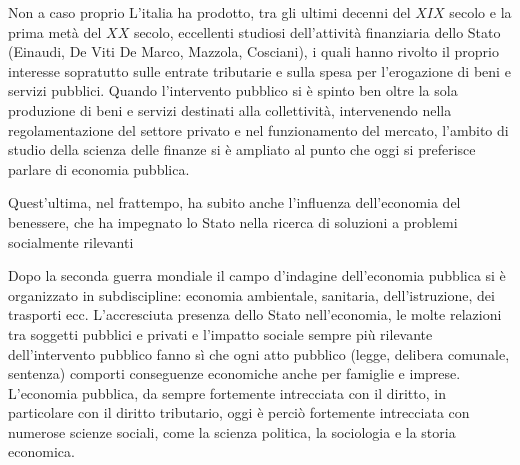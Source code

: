 \documentclass{report}
\begin{document}
Non a caso proprio L'italia ha prodotto, tra gli ultimi decenni del $XIX$ secolo e la prima metà del $XX$ secolo, eccellenti studiosi dell'attività finanziaria dello Stato (Einaudi, De Viti De Marco, Mazzola, Cosciani), i quali hanno rivolto il proprio interesse sopratutto sulle entrate tributarie e sulla spesa per l'erogazione di beni e servizi pubblici.
Quando l'intervento pubblico si è spinto ben oltre la sola produzione di beni e servizi destinati alla collettività, intervenendo nella regolamentazione del settore privato e nel funzionamento del mercato, l'ambito di studio della scienza delle finanze si è ampliato al punto che oggi si preferisce parlare di economia pubblica.

Quest'ultima, nel frattempo, ha subito anche l'influenza dell'economia del benessere, che ha impegnato lo Stato nella ricerca di soluzioni a problemi socialmente rilevanti

Dopo la seconda guerra mondiale il campo d'indagine dell'economia pubblica si è organizzato in subdiscipline: economia ambientale, sanitaria, dell'istruzione, dei trasporti ecc.
L'accresciuta presenza dello Stato nell'economia, le molte relazioni tra soggetti pubblici e privati e l'impatto sociale sempre più rilevante dell'intervento pubblico fanno sì che ogni atto pubblico (legge, delibera comunale, sentenza) comporti conseguenze economiche anche per famiglie e imprese.
L'economia pubblica, da sempre fortemente intrecciata con il diritto, in particolare con il diritto tributario, oggi è perciò fortemente intrecciata con numerose scienze sociali, come la scienza politica, la sociologia e la storia economica.
\end{document}

